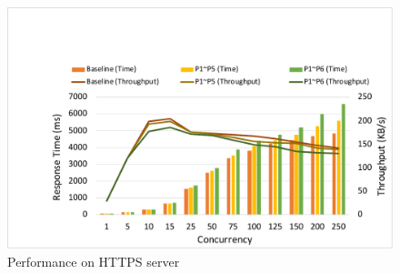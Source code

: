 \begin{figure}[htbp]
\centerline{\includegraphics[scale=0.48]{figures/fg-https-server.pdf}}
\vspace{-2pt}
\caption{Performance on HTTPS server}\label{fg-https-all}
\vspace{-15pt}
\end{figure}